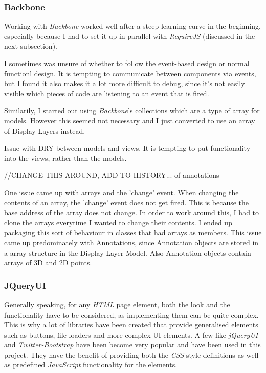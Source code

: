 \documentclass[a4paper,11pt,twoside]{article}
\begin{document}
\subsubsection{Backbone}

Working with \textit{Backbone} worked well after a steep learning curve in the beginning, especially because I had to set it up in parallel with \textit{RequireJS} (discussed in the next subsection).

I sometimes was unsure of whether to follow the event-based design or normal functionl design. It is tempting to communicate between components via events, but I found it also makes it a lot more difficult to debug, since it's not easily visible which pieces of code are listening to an event that is fired.

Similarily, I started out using \textit{Backbone}'s collections which are a type of array for models. However this seemed not necessary and I just converted to use an array of Display Layers instead.

Issue with DRY between models and views. It is tempting to put functionality into the views, rather than the models.

//CHANGE THIS AROUND, ADD TO HISTORY... of annotations

One issue came up with arrays and the 'change' event. When changing the contents of an array, the 'change' event does not get fired. This is because the base address of the array does not change. In order to work around this, I had to clone the arrays everytime I wanted to change their contents. I ended up packaging this sort of behaviour in classes that had arrays as members. This issue came up predominately with Annotations, since Annotation objects are stored in a array structure in the Display Layer Model. Also Annotation objects contain arrays of 3D and 2D points.






\subsubsection{JQueryUI}

Generally speaking, for any \textit{HTML} page element, both the look and the functionality have to be considered, as implementing them can be quite complex. This is why a lot of libraries have been created that provide generalised elements such as buttons, file loaders and more complex UI elements. A few like \textit{jQueryUI} and \textit{Twitter-Bootstrap} have been become very popular and have been used in this project. They have the benefit of providing both the \textit{CSS} style definitions as well as predefined \textit{JavaScript} functionality for the elements. 
\end{document}
